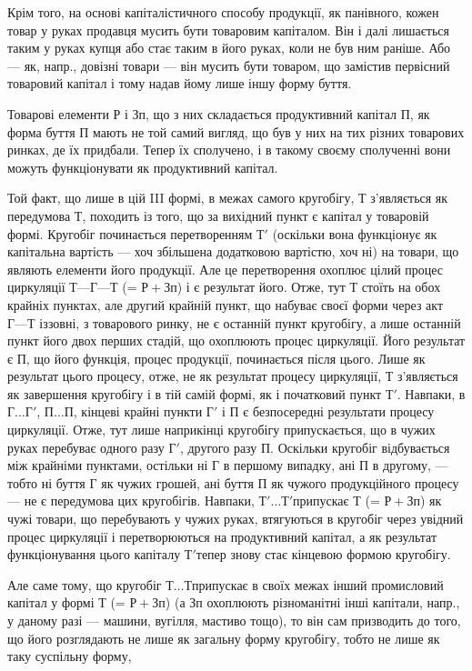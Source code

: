Крім того, на основі капіталістичного способу продукції, як панівного, кожен товар у руках продавця
мусить бути товаровим капіталом. Він і далі лишається таким у руках купця або стає таким в його
руках, коли не був ним раніше. Або — як, напр., довізні товари — він мусить бути товаром, що
замістив первісний товаровий капітал і тому надав йому лише іншу форму буття.

Товарові елементи Р і Зп, що з них складається продуктивний капітал П, як форма буття П мають не той
самий вигляд, що був у них на тих різних товарових ринках, де їх придбали. Тепер їх сполучено, і в
такому своєму сполученні вони можуть функціонувати як продуктивний капітал.

Той факт, що лише в цій III формі, в межах самого кругобігу, Т з’являється як передумова Т, походить
із того, що за вихідний пункт є капітал у товаровій формі. Кругобіг починається перетворенням $Т'$
(оскільки вона функціонує як капітальна вартість — хоч збільшена додатковою вартістю, хоч ні) на
товари, що являють елементи його продукції. Але це перетворення охоплює цілий процес циркуляції $Т —
Г — Т$ (= $Р+Зп$) і є результат його. Отже, тут Т стоїть на обох крайніх пунктах, але другий крайній
пункт, що набуває своєї форми через акт $Г
— Т$ іззовні, з товарового ринку, не є останній пункт кругобігу, а лише останній пункт його двох
перших стадій, що охоплюють процес циркуляції. Його результат є П, що його функція, процес
продукції, починається після цього. Лише як результат цього процесу, отже, не як результат процесу
циркуляції, Т з’являється як завершення кругобігу і в тій самій формі, як і початковий пункт $Т'$.
Навпаки, в $Г\dots{} Г'$, $П\dots{} П$, кінцеві крайні пункти $Г'$ і П є безпосередні результати процесу
циркуляції. Отже, тут лише наприкінці кругобігу припускається, що в чужих руках перебуває одного
разу $Г'$, другого разу П. Оскільки кругобіг відбувається між крайніми пунктами, остільки ні Г в
першому випадку, ані П в другому, — тобто ні буття Г як чужих грошей, ані буття П як чужого
продукційного процесу — не є передумова цих кругобігів. Навпаки, $Т'\dots{} Т' п$рипускає Т (= $Р+Зп$) як
чужі товари,
що перебувають у чужих руках, втягуються в кругобіг через увідний процес циркуляції і перетворюються
на продуктивний капітал, а як результат функціонування цього капіталу $Т' т$епер знову стає кінцевою
формою кругобігу.

Але саме тому, що кругобіг $Т\dots{} Т п$рипускає в своїх межах інший промисловий капітал у формі Т (=
$Р+Зп$) (а Зп охоплюють різноманітні інші капітали, напр., у даному разі — машини, вугілля, мастиво
тощо), то він сам призводить до того, що його розглядають не лише як загальну форму кругобігу, тобто
не лише як таку суспільну форму,
\parbreak{}  %
